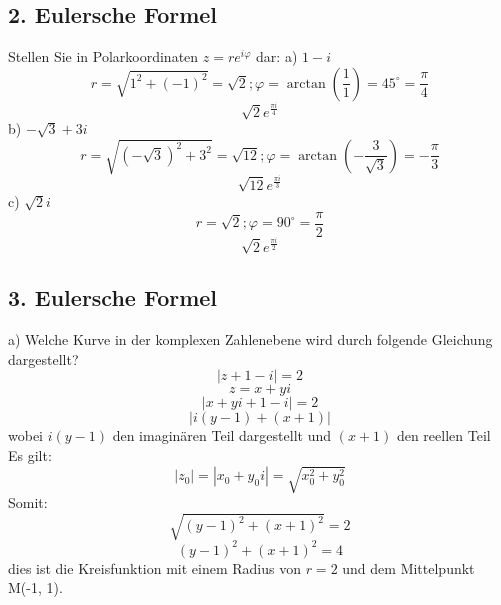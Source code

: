 \documentclass{article}
\begin{document}
    \subsection*{2. Eulersche Formel}
    Stellen Sie in Polarkoordinaten $z = re^{i\varphi}$ dar:
    a) $1-i$ \begin{equation*}
        r=\sqrt{1^2+\left(-1\right)^2}=\sqrt{2}; \varphi=\arctan(\frac{1}{1})=45^{\circ}=\frac{\pi}{4}
    \end{equation*}
    \begin{equation*}
        \sqrt{2}e^{\frac{\pi i}{4}}
    \end{equation*}
    b) $-\sqrt{3}+3i$\begin{equation*}
        r=\sqrt{\left(-\sqrt{3}\right)^2+3^2}=\sqrt{12}; \varphi=\arctan(-\frac{3}{\sqrt{3}})=-\frac{\pi}{3}
    \end{equation*}
    \begin{equation*}
        \sqrt{12}e^{\frac{\pi i}{3}}
    \end{equation*}
    c) $\sqrt{2}i$\begin{equation*}
        r=\sqrt{2};\varphi=90^\circ=\frac{\pi}{2}
    \end{equation*}
    \begin{equation*}
        \sqrt{2}e^{\frac{\pi i}{2}}
    \end{equation*}

    \subsection*{3. Eulersche Formel}
    a) Welche Kurve in der komplexen Zahlenebene wird durch folgende Gleichung dargestellt?
    \begin{equation*}
        | z + 1 - i | = 2 
    \end{equation*}
    \begin{equation*}
        z = x+yi
    \end{equation*}
    \begin{equation*}
        |x+yi+1-i|=2
    \end{equation*}
    \begin{equation*}
        |i(y-1)+(x+1)|
    \end{equation*}
    wobei $i(y-1)$ den imaginären Teil dargestellt und $(x+1)$ den reellen Teil\\
    Es gilt:
    \begin{equation*}
        |z_0| = |x_0 + y_0i| = \sqrt{x_0^2 + y_0^2}
    \end{equation*}
    Somit:
    \begin{equation*}
        \sqrt{\left(y-1\right)^2+\left(x+1\right)^2} = 2
    \end{equation*}
    \begin{equation*}
        \left(y-1\right)^2+\left(x+1\right)^2=4
    \end{equation*}
    dies ist die Kreisfunktion mit einem Radius von $r=2$ und dem Mittelpunkt M(-1,  1).\\\\
\end{document}
